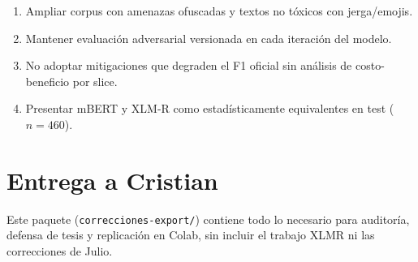 \begin{enumerate}[noitemsep]
  \item Ampliar corpus con amenazas ofuscadas y textos no tóxicos con jerga/emojis.
  \item Mantener evaluación adversarial versionada en cada iteración del modelo.
  \item No adoptar mitigaciones que degraden el F1 oficial sin análisis de costo-beneficio por slice.
  \item Presentar mBERT y XLM-R como estadísticamente equivalentes en test ($n=460$).
\end{enumerate}

\section{Entrega a Cristian}

Este paquete (\texttt{correcciones-export/}) contiene todo lo necesario para auditoría, defensa de tesis y replicación en Colab, sin incluir el trabajo XLMR ni las correcciones de Julio.
